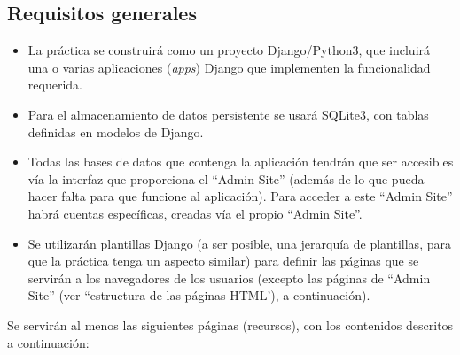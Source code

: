 \subsection{Requisitos generales}

\begin{itemize}

\item La práctica se construirá como un proyecto Django/Python3, que incluirá una o varias aplicaciones (\emph{apps}) Django que implementen la funcionalidad requerida.

\item Para el almacenamiento de datos persistente se usará SQLite3, con tablas definidas en modelos de Django.

\item Todas las bases de datos que contenga la aplicación tendrán que ser accesibles vía la interfaz que proporciona el ``Admin Site'' (además de lo que pueda hacer falta para que funcione al aplicación). Para acceder a este ``Admin Site'' habrá cuentas específicas, creadas vía el propio ``Admin Site''.

\item Se utilizarán plantillas Django (a ser posible, una jerarquía de plantillas, para que la práctica tenga un aspecto similar) para definir las páginas que se servirán a los navegadores de los usuarios (excepto las páginas de ``Admin Site'' (ver ``estructura de las páginas HTML'), a continuación).

\end{itemize}

Se servirán al menos las siguientes páginas (recursos), con los contenidos descritos a continuación:

